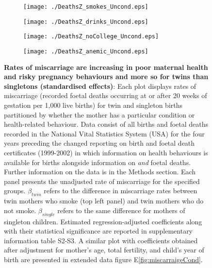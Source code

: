 \documentclass{nature}
\begin{document}
\begin{linenumbers}
\begin{spacing}{1}
\begin{figure}[htpb!]
\begin{subfigure}{.5\textwidth}
  \texttt{[image: ./DeathsZ\_smokes\_Uncond.eps]}
\end{subfigure}%
\begin{subfigure}{.5\textwidth}
  \texttt{[image: ./DeathsZ\_drinks\_Uncond.eps]}
\end{subfigure}
\begin{subfigure}{.5\textwidth}
  \texttt{[image: ./DeathsZ\_noCollege\_Uncond.eps]}
\end{subfigure}%
\begin{subfigure}{.5\textwidth}
  \texttt{[image: ./DeathsZ\_anemic\_Uncond.eps]}
\end{subfigure}
\vspace{5mm}
\caption{\textbf{Rates of miscarriage are increasing in poor maternal health and risky pregnancy behaviours and more so for twins than singletons (standardised effects)}: {\footnotesize Each plot displays rates of miscarriage (recorded foetal deaths occurring at or after 20 weeks of gestation per 1,000 live births) for twin and singleton births partitioned by whether the mother has a particular condition or health-related behaviour. Data consist of all births and foetal deaths recorded in the National Vital Statistics System (USA) for the four years preceding the changed reporting on birth and foetal death certificates (1999-2002) in which information on health behaviours is available for births alongside information on \emph{and} foetal deaths. Further information on the data is in the Methods section. Each panel presents the unadjusted rate of miscarriage for the specified groups. $\beta_{twin}$ refers to the difference in miscarriage rates between twin mothers who smoke (top left panel) and twin mothers who do not smoke. $\beta_{single}$ refers to the same difference for mothers of singleton children. Estimated regression-adjusted coefficients along with their statistical significance are reported in supplementary information table S2-S3. A similar plot with coefficients obtained after adjustment for mother's age, total fertility, and child's year of birth are presented in extended data figure E\ref{fig:miscarraigeCond}.}}
\label{fig:mech2}
\end{figure}
\end{spacing}



\end{linenumbers}
\end{document}
